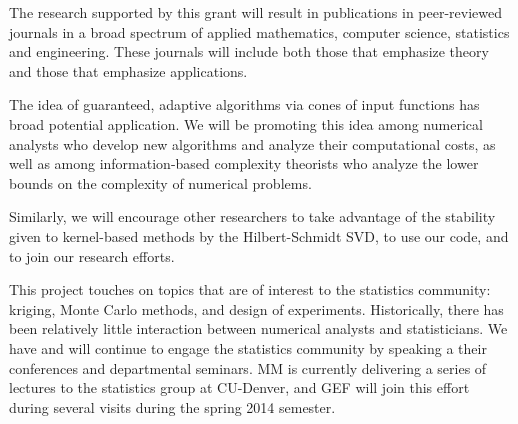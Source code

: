 \begin{description}[leftmargin=2.5ex]
\item[Disseminating Research]
The research supported by this grant will result in publications in peer-reviewed journals in a broad spectrum of applied mathematics, computer science, statistics and engineering. These journals will include both those that emphasize theory and those that emphasize applications.

\item[Promoting Cones] The idea of guaranteed, adaptive algorithms via cones of input functions has broad potential application.  We will be promoting this idea among numerical analysts who develop new algorithms and analyze their computational costs, as well as among information-based complexity theorists who analyze the lower bounds on the complexity of numerical problems.

\item[Promoting the Hilbert-Schmidt SVD] Similarly, we will encourage other researchers to take advantage of the stability given to kernel-based methods by the Hilbert-Schmidt SVD, to use our code, and to join our research efforts.

\item[Bridging Mathematics and Statistics]
This project touches on topics that are of interest to the statistics community: kriging, Monte Carlo methods, and design of experiments.  Historically, there has been relatively little interaction between numerical analysts and statisticians.  We have and will continue to engage the statistics community by speaking a their conferences and departmental seminars.  MM is currently delivering a series of lectures to the statistics group at CU-Denver, and GEF will join this effort during several visits during the spring 2014 semester.


\end{description}
